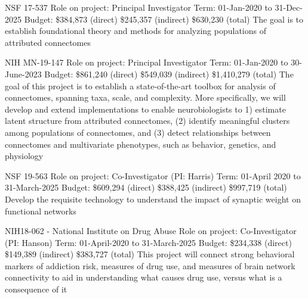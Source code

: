 \documentclass[10pt,colorlinks=true,urlcolor=blue]{moderncv}
\begin{document}
{\newline NSF 17-537
\newline Role on project: Principal Investigator
\newline Term: 01-Jan-2020 to 31-Dec-2025
\newline Budget: \$384,873 (direct) \$245,357 (indirect) \$630,230 (total)
\newline The goal is to establish foundational theory and methods for analyzing populations of
attributed connectomes}{}{}{}{}

{\newline NIH MN-19-147
\newline Role on project: Principal Investigator
\newline Term: 01-Jan-2020 to 30-June-2023
\newline Budget: \$861,240 (direct) \$549,039 (indirect) \$1,410,279 (total)
\newline The goal of this project is to establish a state-of-the-art toolbox for analysis of
connectomes, spanning taxa, scale, and complexity. More specifically, we will develop and
extend implementations to enable neurobiologists to 1) estimate latent structure from
attributed connectomes, (2) identify meaningful clusters among populations of
connectomes, and (3) detect relationships between connectomes and multivariate
phenotypes, such as behavior, genetics, and physiology}{}{}{}{}

{\newline NSF 19-563
\newline Role on project: Co-Investigator (PI: Harris)
\newline Term: 01-April 2020 to 31-March-2025
\newline Budget: \$609,294 (direct) \$388,425 (indirect) \$997,719 (total)
\newline Develop the requisite technology to understand the impact of synaptic weight on functional
networks}{}{}{}{}

{\newline NIH18-062 - National Institute on Drug Abuse
\newline Role on project: Co-Investigator (PI: Hanson)
\newline Term: 01-April-2020 to 31-March-2025
\newline Budget: \$234,338 (direct) \$149,389 (indirect) \$383,727 (total)
\newline This project will connect strong behavioral markers of addiction risk, measures of drug use,
and measures of brain network connectivity to aid in understanding what causes drug use,
versus what is a consequence of it}{}{}{}{}
\end{document}
